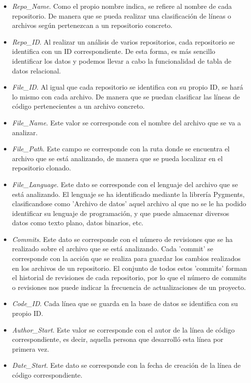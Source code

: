 \documentclass[a4paper, 12pt]{book}
\begin{document}
\begin{itemize}
  \item \textit{Repo\_Name}. Como el propio nombre indica, se refiere al nombre de cada repositorio. De manera que se pueda realizar una clasificación de líneas o archivos según pertenezcan a un repositorio concreto.
  \item \textit{Repo\_ID}. Al realizar un análisis de varios repositorios, cada repositorio se identifica con un ID correspondiente. De esta forma, es más sencillo identificar los datos y podemos llevar a cabo la funcionalidad
  de tabla de datos relacional.
  \item \textit{File\_ID}. Al igual que cada repositorio se identifica con su propio ID, se hará lo mismo con cada archivo. De manera que se puedan clasificar las líneas de código pertenecientes a un archivo concreto.
  \item \textit{File\_Name}. Este valor se corresponde con el nombre del archivo que se va a analizar.
  \item \textit{File\_Path}. Este campo se corresponde con la ruta donde se encuentra el archivo que se está analizando, de manera que se pueda localizar en el repositorio clonado.
  \item \textit{File\_Language}. Este dato se corresponde con el lenguaje del archivo que se está analizando. El lenguaje se ha identificado mediante la librería {Pygments}, clasificandose como 'Archivo de datos' aquel
  archivo al que no se le ha podido identificar su lenguaje de programación, y que puede almacenar diversos datos como texto plano, datos binarios, etc. 
  \item \textit{Commits}. Este dato se corresponde con el número de revisiones que se ha realizado sobre el archivo que se está analizando. Cada 'commit' se corresponde con la acción que se realiza para guardar los cambios realizados en los archivos de 
  un repositorio. El conjunto de todos estos 'commits' forman el historial de revisiones de cada repositorio, por lo que el número de commits o revisiones nos puede indicar la frecuencia de actualizaciones de un proyecto.
  \item \textit{Code\_ID}. Cada línea que se guarda en la base de datos se identifica con su propio ID.
  \item \textit{Author\_Start}. Este valor se corresponde con el autor de la línea de código correspondiente, es decir, aquella persona que desarrolló esta línea por primera vez.
  \item \textit{Date\_Start}. Este dato se corresponde con la fecha de creación de la línea de código correspondiente.

\end{itemize}
\end{document}
